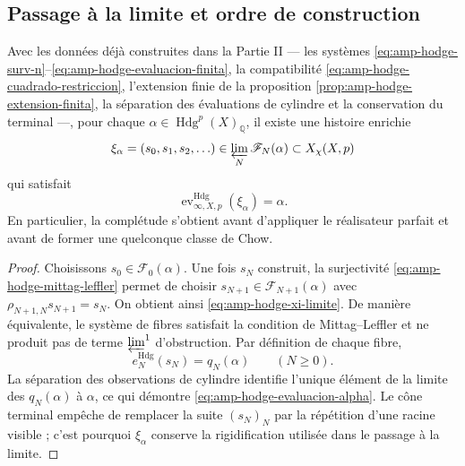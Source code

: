 \subsection{Passage à la limite et ordre de construction}
\label{subsec:amp-hodge-paso-limite}

\begin{theorem}
\label{thm:amp-hodge-completitud-coinductiva}
Avec les données déjà construites dans la Partie II --- les systèmes
\eqref{eq:amp-hodge-surv-n}--\eqref{eq:amp-hodge-evaluacion-finita}, la
compatibilité \eqref{eq:amp-hodge-cuadrado-restriccion}, l'extension finie
de la proposition \ref{prop:amp-hodge-extension-finita}, la séparation des
évaluations de cylindre et la conservation du terminal ---, pour chaque
\(\alpha\in\operatorname{Hdg}^p(X)_{\mathbb Q}\), il existe une histoire
enrichie
\begin{equation}\label{eq:amp-hodge-xi-limite}
 \xi_\alpha=(s_0,s_1,s_2,\ldots)
 \in\varprojlim_N\mathscr F_N(\alpha)
 \subset X_\chi(X,p)
\end{equation}
qui satisfait
\begin{equation}\label{eq:amp-hodge-evaluacion-alpha}
 \operatorname{ev}^{\mathrm{Hdg}}_{\infty,X,p}(\xi_\alpha)=\alpha.
\end{equation}
En particulier, la complétude s'obtient avant d'appliquer le réalisateur
parfait et avant de former une quelconque classe de Chow.
\end{theorem}

\begin{proof}
Choisissons \(s_0\in\mathscr F_0(\alpha)\). Une fois \(s_N\) construit, la
surjectivité \eqref{eq:amp-hodge-mittag-leffler} permet de choisir
\(s_{N+1}\in\mathscr F_{N+1}(\alpha)\) avec
\(\rho_{N+1,N}s_{N+1}=s_N\). On obtient ainsi
\eqref{eq:amp-hodge-xi-limite}. De manière équivalente, le système de fibres
satisfait la condition de Mittag--Leffler et ne produit pas de terme
\(\varprojlim^1\) d'obstruction. Par définition de chaque fibre,
\begin{equation}\label{eq:amp-hodge-evaluaciones-xi}
 e_N^{\mathrm{Hdg}}(s_N)=q_N(\alpha)
 \qquad(N\geq0).
\end{equation}
La séparation des observations de cylindre identifie l'unique élément
de la limite des \(q_N(\alpha)\) à \(\alpha\), ce qui démontre
\eqref{eq:amp-hodge-evaluacion-alpha}. Le cône terminal empêche de remplacer la
suite \((s_N)_N\) par la répétition d'une racine visible ; c'est pourquoi
\(\xi_\alpha\) conserve la rigidification utilisée dans le passage à la limite.
\end{proof}

